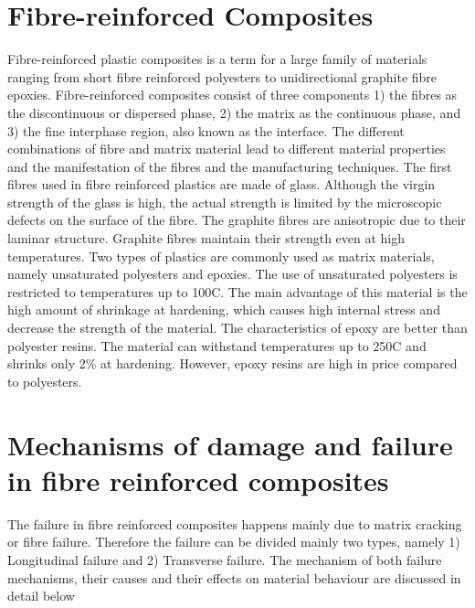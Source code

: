 \documentclass[a4paper,12pt,twoside]{report}
\begin{document}
\section{Fibre-reinforced Composites}
\indent\indent\indent  Fibre-reinforced plastic composites is a term for a large family of materials ranging from short fibre reinforced polyesters to unidirectional graphite fibre epoxies. Fibre-reinforced composites consist of three components 1) the fibres as the discontinuous or dispersed phase, 2) the matrix as the continuous phase, and 3) the fine interphase region, also known as the interface. The different combinations of fibre and matrix material lead to different material properties and the manifestation of the fibres and the manufacturing techniques. The first fibres used in fibre reinforced plastics are made of glass. Although the virgin strength of the glass is high, the actual strength is limited by the microscopic defects on the surface of the fibre. The graphite fibres are anisotropic due to their laminar structure. Graphite fibres maintain their strength even at high temperatures. Two types of plastics are commonly used as matrix materials, namely unsaturated polyesters and epoxies. The use of unsaturated polyesters is restricted to temperatures up to 100C. The main advantage of this material is the high amount of shrinkage at hardening, which causes high internal stress and decrease the strength of the material.  The characteristics of epoxy are better than polyester resins. The material can withstand temperatures up to 250C and shrinks only  2\%  at hardening. However, epoxy resins are high in price compared to polyesters.


\section{Mechanisms of damage and failure in fibre reinforced composites}
\indent\indent\indent The failure in fibre reinforced composites happens mainly due to matrix cracking or fibre failure. Therefore the failure can be divided mainly two types, namely 1) Longitudinal failure and 2) Transverse failure. The mechanism of both failure mechanisms, their causes and their effects on material behaviour are discussed in detail below
\end{document}
